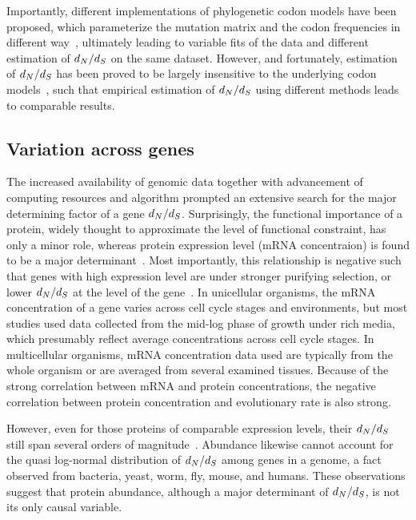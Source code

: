 Importantly, different implementations of phylogenetic \gls{codon} models have been proposed, which parameterize the mutation matrix and the \gls{codon} frequencies in different way~\citep{Muse1994, Goldman1994}, ultimately leading to variable fits of the data and different estimation of $d_N / d_S$ on the same dataset.
However, and fortunately, estimation of $d_N / d_S$ has been proved to be largely insensitive to the underlying \gls{codon} models~\citep{Spielman2018}, such that empirical estimation of $d_N / d_S$ using different methods leads to comparable results.

\subsection{Variation across genes}

The increased availability of genomic data together with advancement of computing resources and algorithm prompted an extensive search for the major determining factor of a gene $d_N / d_S$.
Surprisingly, the functional importance of a protein, widely thought to approximate the level of functional constraint, has only a minor role, whereas protein expression level (mRNA concentraion) is found to be a major determinant~\citep{Zhang2015}.
Most importantly, this relationship is negative such that genes with high expression level are under stronger purifying selection, or lower $d_N / d_S$ at the level of the gene~\citep{Duret2000, Drummond2005a, Zhang2015}.
In unicellular organisms, the mRNA concentration of a gene varies across cell cycle stages and environments, but most studies used data collected from the mid-log phase of growth under rich media, which presumably reflect average concentrations across cell cycle stages.
In multicellular organisms, mRNA concentration data used are typically from the whole organism or are averaged from several examined tissues.
Because of the strong correlation between mRNA and protein concentrations, the negative correlation between protein concentration and evolutionary rate is also strong.

However, even for those proteins of comparable expression levels, their $d_N / d_S$ still span several orders of magnitude~\citep{Drummond2008}.
Abundance likewise cannot account for the quasi log-normal distribution of $d_N / d_S$ among genes in a genome, a fact observed from bacteria, yeast, worm, fly, mouse, and humans.
These observations suggest that protein abundance, although a major determinant of $d_N / d_S$, is not its only causal variable.

